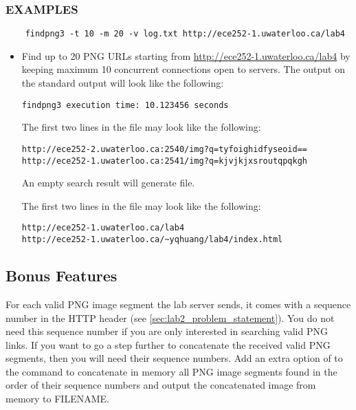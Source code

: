 \subsubsection*{EXAMPLES}
\begin{verbatim}
    findpng3 -t 10 -m 20 -v log.txt http://ece252-1.uwaterloo.ca/lab4
\end{verbatim}
\begin{itemize}
\item[]Find up to 20 PNG URLs starting from \url{http://ece252-1.uwaterloo.ca/lab4} by keeping maximum 10 concurrent connections open to servers.
The output on the standard output will look like the following:
\begin{verbatim}
findpng3 execution time: 10.123456 seconds
\end{verbatim}
The first two lines in the  file may look like the following:
\begin{verbatim}
http://ece252-2.uwaterloo.ca:2540/img?q=tyfoighidfyseoid==
http://ece252-1.uwaterloo.ca:2541/img?q=kjvjkjxsroutqpqkgh
\end{verbatim}
An empty search result will generate  file.

The first two lines in the  file may look like the following:
\begin{verbatim}
http://ece252-1.uwaterloo.ca/lab4
http://ece252-1.uwaterloo.ca/~yqhuang/lab4/index.html
\end{verbatim}
\end{itemize}

\iffalse
\subsection{Bonus Features}
\label{sec:findpng3_bonus}
For each valid PNG image segment the lab server sends, it comes with a sequence number in the HTTP header (see \ref{sec:lab2_problem_statement}). You do not need this sequence number if you are only interested in searching valid PNG links. If you want to go a step further to concatenate the received valid PNG segments, then you will need their sequence numbers. Add an extra option of  to the  command to concatenate in memory all PNG image segments found in the order of their sequence numbers and output the concatenated image from memory to FILENAME. 
